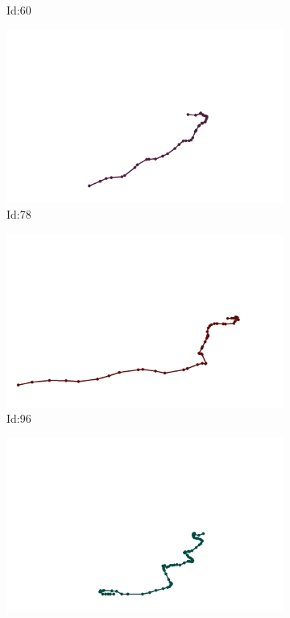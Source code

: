 \documentclass[12pt,twoside]{report}
\begin{document}
\begin{figure}
\begin{subfigure}[b]{0.20\textwidth}
\caption{Id:60}
\end{subfigure}
\begin{subfigure}[b]{0.20\textwidth}
\centering
\includegraphics[width=\textwidth]{../trajectories/78.png}
\caption{Id:78}
\end{subfigure}
\begin{subfigure}[b]{0.20\textwidth}
\centering
\includegraphics[width=\textwidth]{../trajectories/96.png}
\caption{Id:96}
\end{subfigure}
\begin{subfigure}[b]{0.20\textwidth}
\centering
\includegraphics[width=\textwidth]{../trajectories/213.png}

\end{subfigure}
\end{figure}
\end{document}
